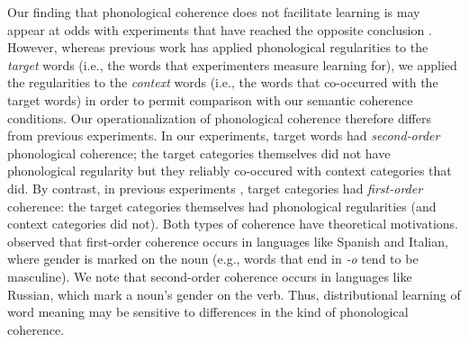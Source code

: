 \documentclass[man,floatsintext]{apa6}
\begin{document}
Our finding that phonological coherence does not facilitate learning is may appear at odds with experiments that have reached the opposite conclusion \citep{frigo1998, monaghan2005, lany2010}. However, whereas previous work has applied phonological regularities to the \emph{target} words (i.e., the words that experimenters measure learning for), we applied the regularities to the \emph{context} words (i.e., the words that co-occurred with the target words) in order to permit comparison with our semantic coherence conditions. Our operationalization of phonological coherence therefore differs from previous experiments. In our experiments, target words had \emph{second-order} phonological coherence; the target categories themselves did not have phonological regularity but they reliably co-occured with context categories that did. By contrast, in previous experiments \citep{lany2010}, target categories had \emph{first-order} coherence: the target categories themselves had phonological regularities (and context categories did not). Both types of coherence have theoretical motivations. \citet{braine1987} observed that first-order coherence occurs in languages like Spanish and Italian, where gender is marked on the noun (e.g., words that end in \emph{-o} tend to be masculine). We note that second-order coherence occurs in languages like Russian, which mark a noun's gender on the verb. Thus, distributional learning of word meaning may be sensitive to differences in the kind of phonological coherence.

\end{document}

